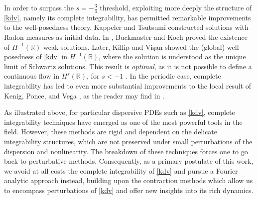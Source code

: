 \documentclass[a4paper,
11pt,  reqno]{amsart}
\newcommand{\5}{\textup{V}}
\theoremstyle{remark}
\newcommand{\R}{\mathbb{R}}
\numberwithin{equation}{section}
\numberwithin{theorem}{section}
\begin{document}
\medskip

In order to surpass the $s=-\frac34$ threshold, exploiting more deeply the structure of \eqref{kdv}, namely its complete integrability, has 
permitted remarkable improvements to the well-posedness theory. Kappeler \cite{Kappeler_rough} and Tsutsumi \cite{Tsutsumi_kdv_measures} constructed solutions with Radon measures as initial data. In \cite{BuckmasterKoch}, Buckmaster and Koch proved the existence of $H^{-1}(\R)$ weak solutions. Later, Killip and Vi\c{s}an \cite{KillipVisan_kdv} showed the (global) well-posedness of \eqref{kdv} in $H^{-1}(\R)$, where the solution is understood as the unique limit of Schwartz solutions. This result is \emph{optimal}, as it is not possible to define a continuous flow in $H^s(\R)$, for $s<-1$ \cite{Molinet_ill_line}. In the periodic case, complete integrability has led to even more substantial improvements to the local result of Kenig, Ponce, and Vega \cite{kpv_bilin}, {as the reader may find in }\cite{KMMT16, KappelerMolnar18, KT06, KillipVisan_kdv}.

	
	\medskip


As illustrated above, for particular dispersive PDEs such as \eqref{kdv}, complete integrability techniques 
have emerged as one of the most powerful tools in the field. 
However, these methods are rigid and dependent on the delicate integrability structures, which are not preserved under small perturbations of the dispersion and nonlinearity. 
The breakdown of these techniques forces one to go back to perturbative methods.
Consequently, 
as a primary postulate of this work, we 
avoid at all costs the complete integrability of \eqref{kdv} and pursue a Fourier analytic approach instead,
building upon the contraction methods which allow us to encompass perturbations of \eqref{kdv} and offer new insights into its rich dynamics.





\medskip
\end{document}
